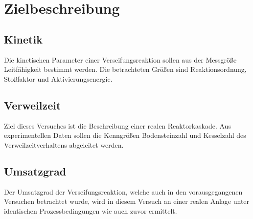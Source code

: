 \section{Zielbeschreibung}
\label{sec:zielbeschreibung}

\subsection{Kinetik}
Die kinetischen Parameter einer Verseifungsreaktion sollen aus der Messgröße Leitfähigkeit bestimmt werden.
Die betrachteten Größen sind Reaktionsordnung, Stoßfaktor und Aktivierungsenergie.
\subsection{Verweilzeit}
Ziel dieses Versuches ist die Beschreibung einer realen Reaktorkaskade. Aus experimentellen Daten sollen die Kenngrößen Bodensteinzahl und Kesselzahl des Verweilzeitverhaltens abgeleitet werden.


\subsection{Umsatzgrad}
Der Umsatzgrad der Verseifungsreaktion, welche auch in den vorausgegangenen Versuchen betrachtet wurde, wird in diesem Versuch an einer realen Anlage unter identischen Prozessbedingungen wie auch zuvor ermittelt.